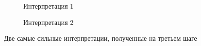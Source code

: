 \documentclass{article}
\begin{document}
\begin{articletext}
\begin{figure}
        \centering
        \begin{subfigure}[b]{0.42\textwidth}
                \caption{Интерпретация 1}
        \end{subfigure}%
        \quad%
        \begin{subfigure}[b]{0.42\textwidth}
                \caption{Интерпретация 2}
        \end{subfigure}
        \caption{Две самые сильные интерпретации, полученные на третьем шаге}\label{step6}
\end{figure}


\end{articletext}
\end{document}
